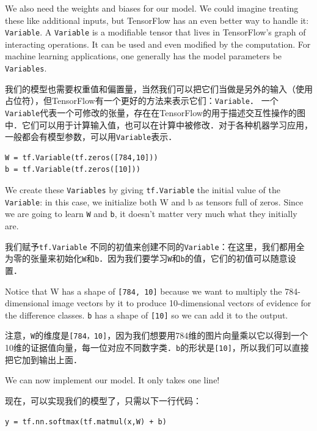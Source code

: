 We also need the weights and biases for our model. We could imagine treating these like additional inputs, but TensorFlow has an even better way to handle it: \lstinline{Variable}. A \lstinline{Variable} is a modifiable tensor that lives in TensorFlow's graph of interacting operations. It can be used and even modified by the computation. For machine learning applications, one generally has the model parameters be \lstinline{Variables}.

我们的模型也需要权重值和偏置量，当然我们可以把它们当做是另外的输入（使用占位符），但TensorFlow有一个更好的方法来表示它们：\lstinline{Variable}． 一个\lstinline{Variable}代表一个可修改的张量，存在在TensorFlow的用于描述交互性操作的图中．它们可以用于计算输入值，也可以在计算中被修改．对于各种机器学习应用，一般都会有模型参数，可以用\lstinline{Variable}表示．

\begin{lstlisting}
W = tf.Variable(tf.zeros([784,10]))
b = tf.Variable(tf.zeros([10]))
\end{lstlisting}

We create these \lstinline{Variables} by giving \lstinline{tf.Variable} the initial value of the \lstinline{Variable}: in this case, we initialize both W and b as tensors full of zeros. Since we are going to learn \lstinline{W} and \lstinline{b}, it doesn't matter very much what they initially are.

我们赋予\lstinline{tf.Variable} 不同的初值来创建不同的\lstinline{Variable}：在这里，我们都用全为零的张量来初始化\lstinline{W}和\lstinline{b}．因为我们要学习\lstinline{W}和\lstinline{b}的值，它们的初值可以随意设置．


Notice that W has a shape of \lstinline{[784, 10]} because we want to multiply the 784-dimensional image vectors by it to produce 10-dimensional vectors of evidence for the difference classes. \lstinline{b} has a shape of \lstinline{[10]} so we can add it to the output.


注意，\lstinline{W}的维度是\lstinline{[784，10]}，因为我们想要用784维的图片向量乘以它以得到一个10维的证据值向量，每一位对应不同数字类．\lstinline{b}的形状是\lstinline{[10]}，所以我们可以直接把它加到输出上面．

We can now implement our model. It only takes one line!

现在，可以实现我们的模型了，只需以下一行代码：

\begin{lstlisting}
y = tf.nn.softmax(tf.matmul(x,W) + b)
\end{lstlisting}

